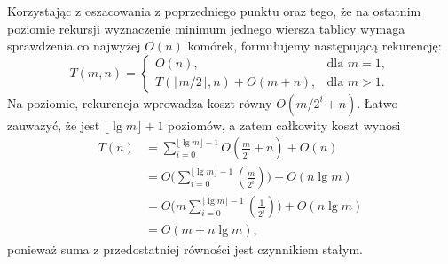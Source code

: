 \subproblem %
Korzystając z oszacowania z poprzedniego punktu oraz tego, że na ostatnim poziomie rekursji wyznaczenie minimum jednego wiersza tablicy wymaga sprawdzenia co najwyżej $O(n)$ komórek, formułujemy następującą rekurencję:
\[
	T(m,n) =
	\begin{cases}
		O(n), & \text{dla $m=1$}, \\
		T(\lfloor m/2\rfloor,n)+O(m+n), & \text{dla $m>1$}.
	\end{cases}
\]
Na  poziomie, rekurencja wprowadza koszt równy $O(m/2^i+n)$. Łatwo zauważyć, że jest $\lfloor\lg m\rfloor+1$ poziomów, a zatem całkowity koszt wynosi
\begin{align*}
	T(n) &= \sum_{i=0}^{\lfloor\lg m\rfloor-1}O\left(\frac{m}{2^i}+n\right)+O(n) \\
	&= O\biggl(\sum_{i=0}^{\lfloor\lg m\rfloor-1}\left(\frac{m}{2^i}\right)\biggr)+O(n\lg m) \\
	&= O\biggl(m\sum_{i=0}^{\lfloor\lg m\rfloor-1}\left(\frac{1}{2^i}\right)\biggr)+O(n\lg m) \\
	&= O(m+n\lg m),
\end{align*}
ponieważ suma z przedostatniej równości jest czynnikiem stałym.

\endinput
